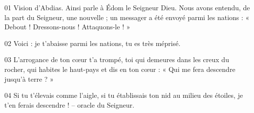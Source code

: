 01 Vision d’Abdias. Ainsi parle à Édom le Seigneur Dieu. Nous avons entendu, de la part du Seigneur, une nouvelle ; un messager a été envoyé parmi les nations : « Debout ! Dressons-nous ! Attaquons-le ! »

02 Voici : je t’abaisse parmi les nations, tu es très méprisé.

03 L’arrogance de ton cœur t’a trompé, toi qui demeures dans les creux du rocher, qui habites le haut-pays et dis en ton cœur : « Qui me fera descendre jusqu’à terre ? »

04 Si tu t’élevais comme l’aigle, si tu établissais ton nid au milieu des étoiles, je t’en ferais descendre ! – oracle du Seigneur.

